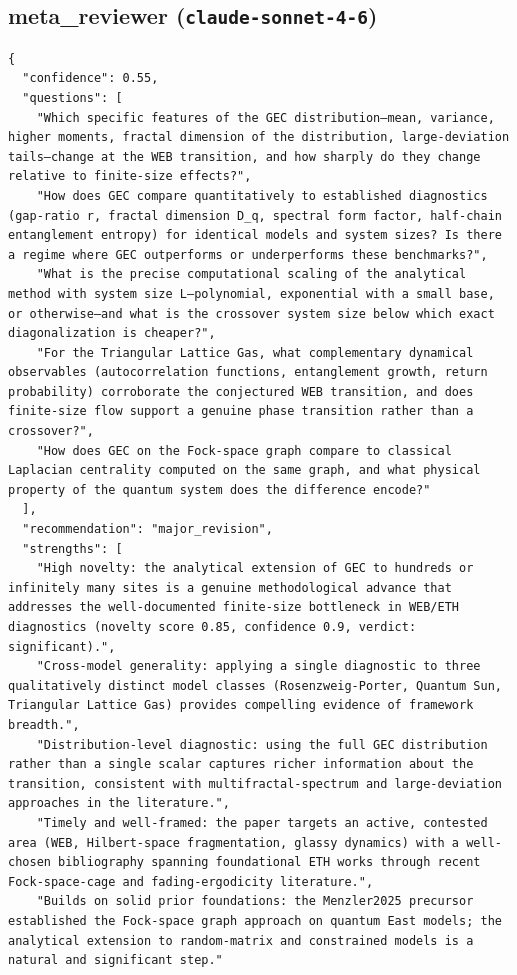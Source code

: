 \documentclass[11pt]{article}
\begin{document}
\subsection*{meta_reviewer (\texttt{claude-sonnet-4-6})}
\begin{verbatim}
{
  "confidence": 0.55,
  "questions": [
    "Which specific features of the GEC distribution—mean, variance, higher moments, fractal dimension of the distribution, large-deviation tails—change at the WEB transition, and how sharply do they change relative to finite-size effects?",
    "How does GEC compare quantitatively to established diagnostics (gap-ratio r, fractal dimension D_q, spectral form factor, half-chain entanglement entropy) for identical models and system sizes? Is there a regime where GEC outperforms or underperforms these benchmarks?",
    "What is the precise computational scaling of the analytical method with system size L—polynomial, exponential with a small base, or otherwise—and what is the crossover system size below which exact diagonalization is cheaper?",
    "For the Triangular Lattice Gas, what complementary dynamical observables (autocorrelation functions, entanglement growth, return probability) corroborate the conjectured WEB transition, and does finite-size flow support a genuine phase transition rather than a crossover?",
    "How does GEC on the Fock-space graph compare to classical Laplacian centrality computed on the same graph, and what physical property of the quantum system does the difference encode?"
  ],
  "recommendation": "major_revision",
  "strengths": [
    "High novelty: the analytical extension of GEC to hundreds or infinitely many sites is a genuine methodological advance that addresses the well-documented finite-size bottleneck in WEB/ETH diagnostics (novelty score 0.85, confidence 0.9, verdict: significant).",
    "Cross-model generality: applying a single diagnostic to three qualitatively distinct model classes (Rosenzweig-Porter, Quantum Sun, Triangular Lattice Gas) provides compelling evidence of framework breadth.",
    "Distribution-level diagnostic: using the full GEC distribution rather than a single scalar captures richer information about the transition, consistent with multifractal-spectrum and large-deviation approaches in the literature.",
    "Timely and well-framed: the paper targets an active, contested area (WEB, Hilbert-space fragmentation, glassy dynamics) with a well-chosen bibliography spanning foundational ETH works through recent Fock-space-cage and fading-ergodicity literature.",
    "Builds on solid prior foundations: the Menzler2025 precursor established the Fock-space graph approach on quantum East models; the analytical extension to random-matrix and constrained models is a natural and significant step."

\end{verbatim}
\end{document}
